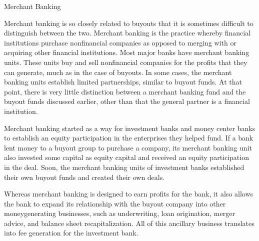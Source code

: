\documentclass[11pt]{article}
\begin{document}
Merchant Banking

Merchant banking is so closely related to buyouts that it is sometimes difficult to distinguish between the two. Merchant banking is the practice whereby financial institutions purchase nonfinancial companies as opposed to merging with or acquiring other financial institutions. Most major banks have merchant banking units. These units buy and sell nonfinancial companies for the profits that they can generate, much as in the case of buyouts. In some cases, the merchant banking units establish limited partnerships, similar to buyout funds. At that point, there is very little distinction between a merchant banking fund and the buyout funds discussed earlier, other than that the general partner is a financial institution.

Merchant banking started as a way for investment banks and money center banks to establish an equity participation in the enterprises they helped fund. If a bank lent money to a buyout group to purchase a company, its merchant banking unit also invested some capital as equity capital and received an equity participation in the deal. Soon, the merchant banking units of investment banks established their own buyout funds and created their own deals.

Whereas merchant banking is designed to earn profits for the bank, it also allows the bank to expand its relationship with the buyout company into other moneygenerating businesses, such as underwriting, loan origination, merger advice, and balance sheet recapitalization. All of this ancillary business translates into fee generation for the investment bank.
\end{document}
